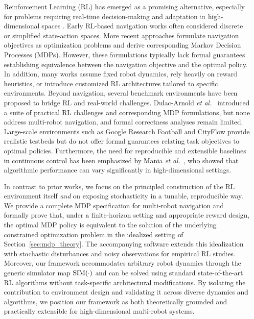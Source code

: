 \documentclass{article}
\begin{document}
Reinforcement Learning (RL) has emerged as a promising alternative, especially for problems requiring real-time decision-making and adaptation in high-dimensional spaces \citep{kober2014, chen2017icra, everett2018iros, bae2019as, tang2025, dulacArnold2021, ibarz2021ijrr}. Early RL-based navigation works \citep{kober2014, bae2019as} often considered discrete or simplified state-action spaces. More recent approaches \citep{chen2017icra, everett2018iros, long2017iral, fan2020ijrr, han2022iral} formulate navigation objectives as optimization problems and derive corresponding Markov Decision Processes (MDPs). However, these formulations typically lack formal guarantees establishing equivalence between the navigation objective and the optimal policy. In addition, many works assume fixed robot dynamics, rely heavily on reward heuristics, or introduce customized RL architectures tailored to specific environments. Beyond navigation, several benchmark environments have been proposed to bridge RL and real-world challenges. Dulac-Arnold \textit{et al.}~\citep{dulacArnold2021} introduced a suite of practical RL challenges and corresponding MDP formulations, but none address multi-robot navigation, and formal correctness analyses remain limited. Large-scale environments such as Google Research Football \citep{kurach2020google} and CityFlow \citep{zhang2019cityflow} provide realistic testbeds but do not offer formal guarantees relating task objectives to optimal policies. Furthermore, the need for reproducible and extensible baselines in continuous control has been emphasized by Mania \textit{et al.}~\citep{mania2018ars}, who showed that algorithmic performance can vary significantly in high-dimensional settings.

In contrast to prior works, we focus on the principled construction of the RL environment itself \emph{and} on exposing stochasticity in a tunable, reproducible way. We provide a complete MDP specification for multi-robot navigation and formally prove that, under a finite-horizon setting and appropriate reward design, the optimal MDP policy is equivalent to the solution of the underlying constrained optimization problem in the idealized setting of Section~\ref{sec:mdp_theory}. The accompanying software extends this idealization with stochastic disturbances and noisy observations for empirical RL studies. Moreover, our framework accommodates arbitrary robot dynamics through the generic simulator map $\operatorname{SIM}(\cdot)$ and can be solved using standard state-of-the-art RL algorithms without task-specific architectural modifications. By isolating the contribution to environment design and validating it across diverse dynamics and algorithms, we position our framework as both theoretically grounded and practically extensible for high-dimensional multi-robot systems.
\end{document}

